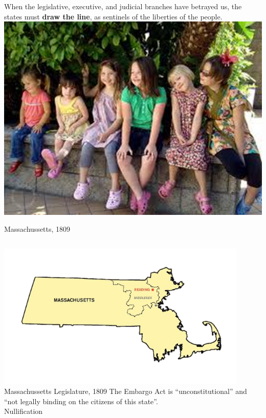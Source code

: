 \begin{frame}
    \centering
    \large{When the legislative, executive, and judicial branches have betrayed us, the states must \textbf{draw the line}, as sentinels of the liberties of the people. \\}
    \includegraphics[height=0.7\textheight]{img/kids.png} \\
\end{frame}

\begin{frame}{Massachussetts, 1809}
    \begin{columns}[c]
            \centering
            \includegraphics[width=0.9\textwidth]{img/massachussetts.png} \\
            Massachussetts Legislature, 1809
        \column{0.5\textheight}
            The Embargo Act is ``unconstitutional'' and ``not legally binding on the citizens of this state''. \\
            \vspace{20pt}
            \pause
            \Large{\color{red}Nullification}
    \end{columns}
\end{frame}

